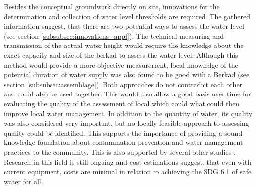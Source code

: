 Besides the conceptual groundwork directly on site, innovations for the determination and collection of water level thresholds are required. The gathered information suggest, that there are two potential ways to assess the water level (see section \ref{subsubsec:innovations_appl}). The technical measuring and transmission of the actual water height would require the knowledge about the exact capacity and size of the berkad to assess the water level. Although this method would provide a more objective measurement, local knowledge of the potential duration of water supply was also found to be good with a Berkad (see section \ref{subsubsec:assemblage}). Both approaches do not contradict each other and could also be used together. This would also allow a good basis over time for evaluating the quality of the assessment of local which could what could then improve local water management. In addition to the quantity of water, its quality was also considered very important, but no locally feasible approach to assessing quality could be identified. This supports the importance of providing a sound knowledge foundation about contamination prevention and water management practices to the community. This is also supported by several other studies \autocite{danielAssessingDrinkingWater2020,huangManagementDrinkingWater2020,tariqOpenSourceWater2021,wmoPlanningWaterqualityMonitoring2013}. Research in this field is still ongoing \autocite{tariqOpenSourceWater2021} and \autocite{delaireHowMuchWill2017} cost estimations suggest, that even with current equipment, costs are minimal in relation to achieving the SDG 6.1 of safe water for all.\newline
